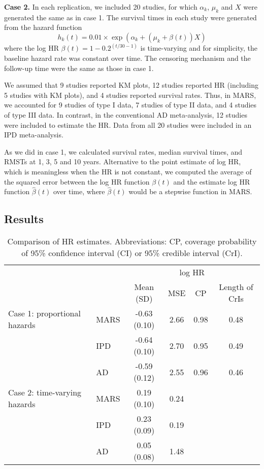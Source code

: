\documentclass[12pt]{article}
\theoremstyle{mystyle}
\begin{document}
\noindent\textbf{Case 2.} \hspace{\parindent}
In each replication, we included 20 studies, for which $\alpha_k$, $\mu_k$ and $X$ were generated the same as in case 1. The survival times in each study were generated from the hazard function 
$$h_k(t)=0.01\times\exp(\alpha_k+(\mu_k+\beta(t))X)$$
where the log HR $\beta(t)=1-0.2^{(t/30-1)}$ is time-varying and for simplicity, the baseline hazard rate was constant over time. The censoring mechanism and the follow-up time were the same as those in case 1. 

We assumed that 9 studies reported KM plots, 12 studies reported HR (including 5 studies with KM plots), and 4 studies reported survival rates. Thus, in MARS, we accounted for 9 studies of type I data, 7 studies of type II data, and 4 studies of type III data. In contrast, in the conventional AD meta-analysis, 12 studies were included to estimate the HR. Data from all 20 studies were included in an IPD meta-analysis. 

As we did in case 1, we calculated survival rates, median survival times, and RMSTs at 1, 3, 5 and 10 years. Alternative to the point estimate of log HR, which is meaningless when the HR is not constant, we computed the average of the squared error between the log HR function $\beta(t)$ and the estimate log HR function $\hat{\beta}(t)$ over time, where $\hat{\beta}(t)$ would be a stepwise function in MARS.  


\subsection{Results}

\begin{table}[ht]
\footnotesize
\caption{\label{tab:table1} Comparison of HR estimates. Abbreviations: CP, coverage probability of 95\% confidence interval (CI) or 95\% credible interval (CrI). }
\begin{center}
\begin{tabular}{llcccc}
    \hline
       &             & \multicolumn{4}{c}{log HR}                   \\ \cline{3-6} 
       &             & Mean (SD)   & MSE  & CP   & Length of CrIs \\ \hline
Case 1: proportional hazards \ & MARS & -0.63 (0.10) & 2.66 & 0.98 & 0.48           \\
       & IPD  & -0.64 (0.10) & 2.70 & 0.95 & 0.49           \\
       & AD   & -0.59 (0.12) & 2.55 & 0.96 & 0.46           \\
Case 2: time-varying hazards \ & MARS & 0.19 (0.10)  & 0.24 &      &                \\
       & IPD  & 0.23 (0.09)  & 0.19 &      &                \\
       & AD   & 0.05 (0.08)  & 1.48 &      &               \\ 
\hline
\end{tabular}
\end{center}
\end{table}
\end{document}
